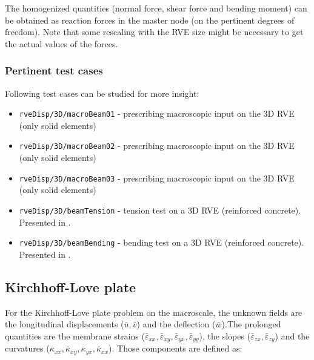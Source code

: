 \documentclass[11pt]{article}
\begin{document}
\noindent The homogenized quantities (normal force, shear force and bending moment) can be obtained as reaction forces in the master node (on the pertinent degrees of freedom). Note that some rescaling with the RVE size might be necessary to get the actual values of the forces.

\subsubsection{Pertinent test cases}
Following test cases can be studied for more insight: 
\begin{itemize}
    \item \texttt{rveDisp/3D/macroBeam01} - prescribing macroscopic input on the 3D RVE (only solid elements)
    \item \texttt{rveDisp/3D/macroBeam02} - prescribing macroscopic input on the 3D RVE (only solid elements)
    \item \texttt{rveDisp/3D/macroBeam03} - prescribing macroscopic input on the 3D RVE (only solid elements)
    \item \texttt{rveDisp/3D/beamTension} - tension test on a 3D RVE (reinforced concrete). Presented in \cite{PaperE}.
    \item \texttt{rveDisp/3D/beamBending} - bending test on a 3D RVE (reinforced concrete). Presented in \cite{PaperE}.

\end{itemize}


\subsection{Kirchhoff-Love plate}

For the Kirchhoff-Love plate problem on the macroscale, the unknown fields are the longitudinal displacements ($\bar{u}, \bar{v}$) and the deflection ($\bar{w}$).The prolonged quantities are the membrane strains ($\bar{\varepsilon}_{xx}, \bar{\varepsilon}_{xy}, \bar{\varepsilon}_{yx}, \bar{\varepsilon}_{yy}$), the slopes ($\bar{\varepsilon}_{zx}, \bar{\varepsilon}_{zy}$) and the curvatures ($\bar{\kappa}_{xx}, \bar{\kappa}_{xy}, \bar{\kappa}_{yx}, \bar{\kappa}_{xx}$). Those components are defined as:
\end{document}
